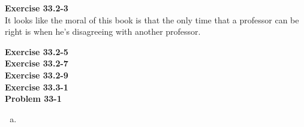 \documentclass{article}
\begin{document}
\noindent\textbf{Exercise 33.2-3}\\

It looks like the moral of this book is that the only time that a professor can be right is when he's disagreeing with another professor.%




\noindent\textbf{Exercise 33.2-5}\\


\noindent\textbf{Exercise 33.2-7}\\


\noindent\textbf{Exercise 33.2-9}\\


\noindent\textbf{Exercise 33.3-1}\\




\noindent\textbf{Problem 33-1}\\
\begin{enumerate}[a.]
\item
\end{enumerate}
\end{document}
